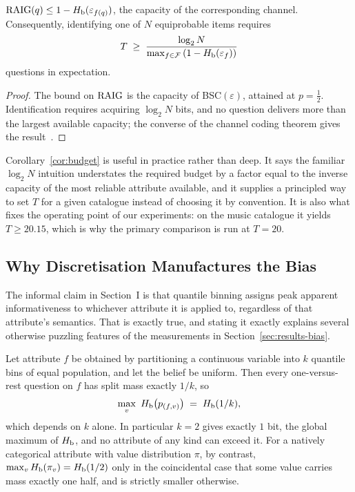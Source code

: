 \begin{corollary}
\label{cor:budget}
$\mathrm{RAIG}(q) \le 1 - H_{\mathrm{b}}(\varepsilon_{f(q)})$, the capacity of the corresponding
channel. Consequently, identifying one of $N$ equiprobable items requires
\begin{equation}
T \;\ge\; \frac{\log_2 N}{\max_{f \in \mathcal{F}}\left(1 - H_{\mathrm{b}}(\varepsilon_f)\right)}
\label{eq:budget}
\end{equation}
questions in expectation.
\end{corollary}

\begin{proof}
The bound on $\mathrm{RAIG}$ is the capacity of BSC$(\varepsilon)$, attained at
$p=\tfrac12$. Identification requires acquiring $\log_2 N$ bits, and no
question delivers more than the largest available capacity; the converse of the
channel coding theorem gives the result~\cite[Ch.~7]{cover2006}.
\end{proof}

Corollary~\ref{cor:budget} is useful in practice rather than deep. It says the
familiar $\log_2 N$ intuition understates the required budget by a factor equal
to the inverse capacity of the most reliable attribute available, and it
supplies a principled way to set $T$ for a given catalogue instead of choosing
it by convention. It is also what fixes the operating point of our experiments:
on the music catalogue it yields $T \ge 20.15$, which is why the primary
comparison is run at $T=20$.

\subsection{Why Discretisation Manufactures the Bias}
\label{sec:discretisation-theory}

The informal claim in Section~I is that quantile binning assigns peak apparent
informativeness to whichever attribute it is applied to, regardless of that
attribute's semantics. That is exactly true, and stating it exactly explains
several otherwise puzzling features of the measurements in
Section~\ref{sec:results-bias}.

\begin{proposition}
\label{prop:discretisation}
Let attribute $f$ be obtained by partitioning a continuous variable into $k$
quantile bins of equal population, and let the belief be uniform. Then every
one-versus-rest question on $f$ has split mass exactly $1/k$, so
\begin{equation}
\max_{v}\ H_{\mathrm{b}}\!\left(p_{(f,v)}\right) \;=\; H_{\mathrm{b}}(1/k),
\label{eq:binmax}
\end{equation}
which depends on $k$ alone. In particular $k=2$ gives exactly $1$ bit, the
global maximum of $H_{\mathrm{b}}$, and no attribute of any kind can exceed it. For a
natively categorical attribute with value distribution $\pi$, by contrast,
$\max_v H_{\mathrm{b}}(\pi_v) = H_{\mathrm{b}}(1/2)$ only in the coincidental case that some value
carries mass exactly one half, and is strictly smaller otherwise.
\end{proposition}

